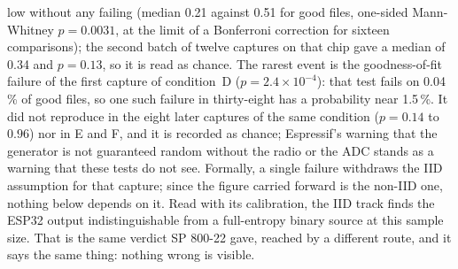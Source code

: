 low without any failing (median 0.21 against 0.51 for good files,
one-sided Mann-Whitney $p = 0.0031$, at the limit of a Bonferroni
correction for sixteen comparisons); the second batch of twelve captures
on that chip gave a median of 0.34 and $p = 0.13$, so it is read as
chance. The rarest
event is the goodness-of-fit failure of the first capture of condition~D
($p = 2.4\times10^{-4}$): that test fails on 0.04\,\% of good files, so
one such failure in thirty-eight has a probability near 1.5\,\%. It did not
reproduce in the eight later captures of the same condition ($p = 0.14$ to
$0.96$) nor in E and F, and it is recorded as chance; Espressif's warning
that the generator is not guaranteed random without the radio or the ADC
stands as a warning that these tests do not see. Formally, a single
failure withdraws the IID assumption for that capture; since the figure
carried forward is the non-IID one, nothing below depends on it. Read
with its calibration, the IID track finds the ESP32 output
indistinguishable from a full-entropy binary source at this sample size.
That is the same verdict SP 800-22 gave, reached by a different route,
and it says the same thing: nothing wrong is visible.

